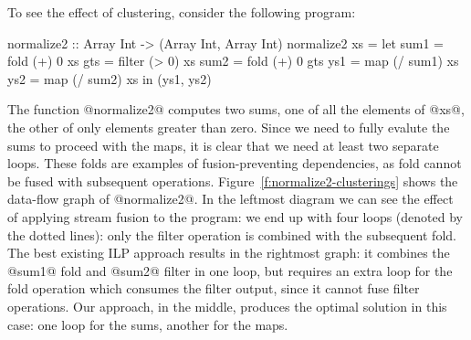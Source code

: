 To see the effect of clustering, consider the following program:
\begin{code}
 normalize2 :: Array Int -> (Array Int, Array Int)
 normalize2 xs
  = let sum1 = fold   (+)  0   xs
        gts  = filter (>   0)  xs
        sum2 = fold   (+)  0   gts
        ys1  = map    (/ sum1) xs
        ys2  = map    (/ sum2) xs
    in (ys1, ys2)
\end{code}

The function @normalize2@ computes two sums, one of all the elements of @xs@, the other of only elements greater than zero. Since we need to fully evalute the sums to proceed with the maps, it is clear that we need at least two separate loops. These folds are examples of fusion-preventing dependencies, as fold cannot be fused with subsequent operations. Figure~\ref{f:normalize2-clusterings} shows the data-flow graph of @normalize2@. In the leftmost diagram we can see the effect of applying stream fusion to the program: we end up with four loops (denoted by the dotted lines): only the filter operation is combined with the subsequent fold. The best existing ILP approach results in the rightmost graph: it combines the @sum1@ fold and @sum2@ filter in one loop, but requires an extra loop for the fold operation which consumes the filter output, since it cannot fuse filter operations. Our approach, in the middle, produces the optimal solution in this case: one loop for the sums, another for the maps.


